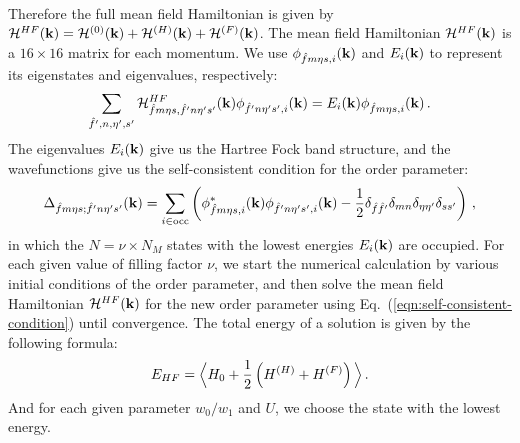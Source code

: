 \documentclass[prb,aps,nofootinbib,amssymb,twocolumn,superscriptaddress,10pt]{revtex4-2}
\begin{document}
\begin{widetext}
\begin{align}
\end{align}
Therefore the full mean field Hamiltonian is given by $\mathcal{H}^{HF}(\mathbf{k}) = \mathcal{H}^{(0)}(\mathbf{k}) + \mathcal{H}^{(H)}(\mathbf{k}) + \mathcal{H}^{(F)}(\mathbf{k})$. The mean field Hamiltonian $\mathcal{H}^{HF}(\mathbf{k})$ is a $16\times 16$ matrix for each momentum. We use $\phi_{\hat{f}m\eta s, i}(\mathbf{k})$ and $E_i(\mathbf{k})$ to represent its eigenstates and eigenvalues, respectively:
\begin{equation}
	\sum_{\hat{f}',n,\eta',s'}\mathcal{H}^{HF}_{\hat{f}m\eta s, \hat{f}'n\eta's'}(\mathbf{k}) \phi_{\hat{f}'n\eta's', i}(\mathbf{k}) = E_i(\mathbf{k})\phi_{\hat{f}m\eta s, i}(\mathbf{k})\,.
\end{equation}
The eigenvalues $E_i(\mathbf{k})$ give us the Hartree Fock band structure, and the wavefunctions give us the self-consistent condition for the order parameter:
\begin{equation}\label{eqn:self-consistent-condition}
	\Delta_{\hat{f}m\eta s;\hat{f}'n\eta's'}(\mathbf{k}) = \sum_{i\in{\rm occ}}\left(\phi^*_{\hat{f}m\eta s, i}(\mathbf{k})\phi_{\hat{f}'n\eta's', i}(\mathbf{k}) - \frac12 \delta_{\hat{f}\hat{f}'}\delta_{mn}\delta_{\eta\eta'}\delta_{ss'}\right)\,,
\end{equation}
in which the $N = \nu\times N_M$ states with the lowest energies $E_i(\mathbf{k})$ are occupied. For each given value of filling factor $\nu$, we start the numerical calculation by various initial conditions of the order parameter, and then solve the mean field Hamiltonian $\mathcal{H}^{HF}(\mathbf{k})$ for the new order parameter using Eq.~(\ref{eqn:self-consistent-condition}) until convergence. The total energy of a solution is given by the following formula:
\begin{equation}\label{seq-EHF}
	E_{HF} = \Big{\langle} H_0 + \frac{1}{2}\left(H^{(H)} + H^{(F)}\right) \Big{\rangle}\,.
\end{equation}
And for each given parameter $w_0/w_1$ and $U$, we choose the state with the lowest energy.


\end{widetext}
\end{document}
